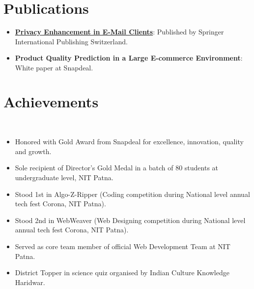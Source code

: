 \documentclass[letterpaper,11pt]{article}
\newcommand{\resumeItem}[2]{
  \item[$\circ$]\small{
    \textbf{#1}{: #2 \vspace{-2pt}}
  }
}
\newcommand{\resumeItems}[2]{
	\item[$\circ$]\small{
		\textbf{#1}{ #2 \vspace{-7pt}}
	}
}
\newcommand{\resumeSubItem}[2]{\resumeItem{#1}{#2}\vspace{-4pt}}
\newcommand{\resumeSubHeadingListStart}{\begin{itemize}[ leftmargin=*]}
\newcommand{\resumeSubHeadingListEnd}{\end{itemize}}
\newcommand{\resumeItemListStart}{\begin{itemize}}
\newcommand{\resumeItemListEnd}{\end{itemize}\vspace{-5pt}}
\begin{document}
\section{Publications}
\resumeSubHeadingListStart
\resumeSubItem{ \href{https://rd.springer.com/chapter/10.1007/978-3-319-32467-8_118}{Privacy Enhancement in E-Mail Clients}}
{Published by Springer International Publishing Switzerland.}
\resumeSubItem{ Product Quality Prediction in a Large E-commerce Environment}
{White paper at Snapdeal.}
\resumeSubHeadingListEnd

\section{Achievements}
\ \resumeItemListStart
	\resumeItems{}{Honored with Gold Award from Snapdeal for excellence, innovation, quality and growth.}
	\resumeItems{}{Sole recipient of Director's Gold Medal in a batch of 80 students at undergraduate level, NIT Patna.}
	\resumeItems{}{Stood 1st in Algo-Z-Ripper (Coding competition during National level annual tech fest Corona, NIT Patna).}
	\resumeItems{}{Stood 2nd in WebWeaver (Web Designing competition during National level annual tech fest Corona, NIT Patna).}
	\resumeItems{}{Served as core team member of official Web Development Team at NIT Patna.}
	\resumeItems{}{District Topper in science quiz organised by Indian Culture Knowledge Haridwar.}
\resumeItemListEnd
\end{document}
